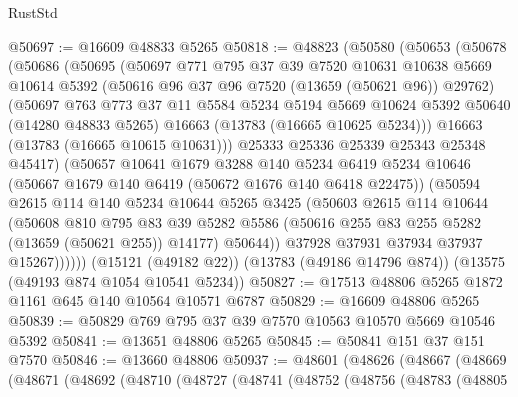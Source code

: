 \begin{lexlean}{RustStd}
\begin{coremodule}
@50697 := @16609 @48833 @5265
@50818 := @48823
    (@50580
      (@50653
        (@50678
          (@50686
            (@50695
              (@50697
                @771
                @795
                @37
                @39
                @7520
                @10631
                @10638
                @5669
                @10614
                @5392
                (@50616 @96 @37 @96 @7520 (@13659 (@50621 @96)) @29762)
                (@50697
                  @763
                  @773
                  @37
                  @11
                  @5584
                  @5234
                  @5194
                  @5669
                  @10624
                  @5392
                  @50640
                  (@14280 @48833 @5265)
                  @16663
                  (@13783 (@16665 @10625 @5234)))
                @16663
                (@13783 (@16665 @10615 @10631)))
              @25333
              @25336
              @25339
              @25343
              @25348
              @45417)
            (@50657
              @10641
              @1679
              @3288
              @140
              @5234
              @6419
              @5234
              @10646
              (@50667 @1679 @140 @6419 (@50672 @1676 @140 @6418 @22475))
              (@50594
                @2615
                @114
                @140
                @5234
                @10644
                @5265
                @3425
                (@50603
                  @2615
                  @114
                  @10644
                  (@50608
                    @810
                    @795
                    @83
                    @39
                    @5282
                    @5586
                    (@50616 @255 @83 @255 @5282 (@13659 (@50621 @255)) @14177)
                    @50644))
                @37928
                @37931
                @37934
                @37937
                @15267))))))
    (@15121 (@49182 @22))
    (@13783 (@49186 @14796 @874))
    (@13575 (@49193 @874 @1054 @10541 @5234))
@50827 := @17513 @48806 @5265 @1872 @1161 @645 @140 @10564 @10571 @6787
@50829 := @16609 @48806 @5265
@50839 := @50829 @769 @795 @37 @39 @7570 @10563 @10570 @5669 @10546 @5392
@50841 := @13651 @48806 @5265
@50845 := @50841 @151 @37 @151 @7570
@50846 := @13660 @48806
@50937 := @48601
    (@48626
      (@48667
        (@48669
          (@48671
            (@48692
              (@48710
                (@48727
                  (@48741
                    (@48752
                      (@48756
                        (@48783
                          (@48805

\end{coremodule}
\end{lexlean}
